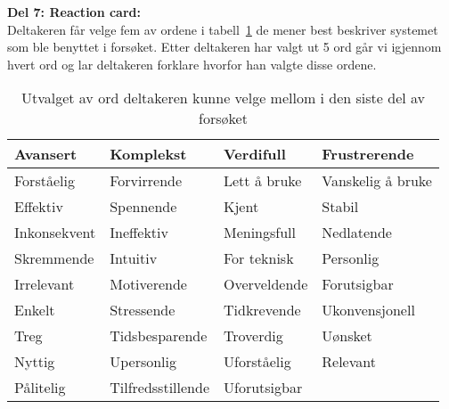 \textbf{Del 7: Reaction card:}\\
Deltakeren får velge fem av ordene i tabell~\ref{tab:reactionCardTabVedlegg} de mener best beskriver systemet som ble benyttet i forsøket. Etter deltakeren har valgt ut 5 ord går vi igjennom hvert ord og lar deltakeren forklare hvorfor han valgte disse ordene.

\begin{table}[H]
    \centering
    \begin{tabular}{ | p{2.6cm} | p{2.6cm} | p{2.6cm} | p{2.6cm} |}
      \hline
        Avansert & Komplekst & Verdifull & Frustrerende \\ \hline
        Forståelig & Forvirrende & Lett å bruke & Vanskelig å bruke \\ \hline
        Effektiv & Spennende & Kjent & Stabil \\ \hline
        Inkonsekvent & Ineffektiv & Meningsfull & Nedlatende\\ \hline
        Skremmende & Intuitiv & For teknisk & Personlig \\ \hline
        Irrelevant & Motiverende & Overveldende & Forutsigbar  \\ \hline
        Enkelt & Stressende & Tidkrevende & Ukonvensjonell \\ \hline
        Treg & Tidsbesparende & Troverdig & Uønsket \\\hline
        Nyttig & Upersonlig & Uforståelig & Relevant \\\hline
        Pålitelig & Tilfredsstillende & Uforutsigbar & \\\hline
        \end{tabular}
    \caption{Utvalget av ord deltakeren kunne velge mellom i den siste del av forsøket}
    \label{tab:reactionCardTabVedlegg}
\end{table}
